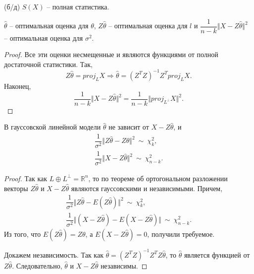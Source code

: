 \begin{theorem}
    (б/д) $\displaystyle S( X)$ -- полная статистика.
\end{theorem}
\begin{corollary}
    $\displaystyle \hat{\theta }$ -- оптимальная оценка для $\displaystyle \theta $, $\displaystyle Z\hat{\theta }$ -- оптимальная оценка для $\displaystyle l$ и $\displaystyle \dfrac{1}{n-k}\Vert X-Z\hat{\theta }\Vert ^{2}$ -- оптимальная оценка для $\displaystyle \sigma ^{2}$.
\end{corollary}
\begin{proof}
    Все эти оценки несмещенные и являются функциями от полной достаточной статистики. Так,
    \begin{equation*}
        Z\hat{\theta } =proj_{L} X\Rightarrow \hat{\theta } =\left( Z^{T} Z\right)^{-1} Z^{T} proj_{L} X.
    \end{equation*}
    Наконец,
    \begin{equation*}
        \dfrac{1}{n-k}\Vert X-Z\hat{\theta }\Vert ^{2} =\dfrac{1}{n-k}\Vert proj_{L^{\perp }} X\Vert ^{2} .
    \end{equation*}
\end{proof}
\begin{proposition}
    В гауссовской линейной модели $\displaystyle \hat{\theta }$ не зависит от $\displaystyle X-Z\hat{\theta }$, и
    \begin{gather*}
        \dfrac{1}{\sigma ^{2}}\Vert Z\hat{\theta } -Z\theta \Vert ^{2} \ \sim \ \chi _{k}^{2} ,\\
        \dfrac{1}{\sigma ^{2}}\Vert X-Z\hat{\theta }\Vert ^{2} \ \sim \ \chi _{n-k}^{2} .
    \end{gather*}
\end{proposition}
\begin{proof}
    Так как $\displaystyle L\oplus L^{\perp } =\mathbb{R}^{n}$, то по теореме об ортогональном разложении векторы $\displaystyle Z\hat{\theta }$ и $\displaystyle X-Z\hat{\theta }$ являются гауссовскими и независимыми. Причем,
    \begin{gather*}
        \dfrac{1}{\sigma ^{2}}\Vert Z\hat{\theta } -E( Z\hat{\theta })\Vert ^{2} \ \sim \ \chi _{k}^{2} ,\\
        \dfrac{1}{\sigma ^{2}}\Vert ( X-Z\hat{\theta }) -E( X-Z\hat{\theta })\Vert \ \sim \ \chi _{n-k}^{2} .
    \end{gather*}
    Из того, что $\displaystyle E( Z\hat{\theta }) =Z\theta $, а $\displaystyle E( X-Z\hat{\theta }) =0$, получили требуемое.
    
    Докажем независимость. Так как $\displaystyle \hat{\theta } =\left( Z^{T} Z\right)^{-1} Z^{T} Z\hat{\theta }$, то $\displaystyle \hat{\theta }$ является функцией от $\displaystyle Z\hat{\theta }$. Следовательно, $\displaystyle \hat{\theta }$ и $\displaystyle X-Z\hat{\theta }$ независимы.
\end{proof}
